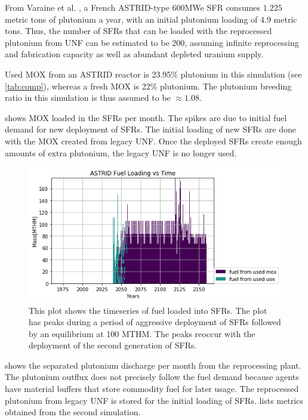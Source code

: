 From Varaine et al. \cite{varaine_pre-conceptual_2012}, a French
ASTRID-type 600\gls{MWe} \gls{SFR} consumes $1.225$ metric tons of
plutonium a year, with an initial plutonium loading of $4.9$ metric tons. 
Thus, the number of \glspl{SFR} that can be loaded with the reprocessed
plutonium from \gls{UNF} can be estimated to be 200, assuming infinite 
reprocessing and fabrication capacity as well as abundant depleted uranium 
supply.
 
Used \gls{MOX} from an ASTRID reactor is 23.95\% plutonium
in this simulation (see \cref{tab:comp}), whereas a fresh \gls{MOX} is 22\% plutonium.
The plutonium breeding ratio in this simulation is thus assumed to be
$\approx 1.08$.

 shows \gls{MOX} loaded in the \glspl{SFR} per month.
The spikes are due to initial fuel demand for new deployment of \glspl{SFR}.
The initial loading of new \glspl{SFR} are done with the \gls{MOX} created
from legacy \gls{UNF}. Once the deployed \glspl{SFR} create enough amounts
 of extra plutonium, the legacy \gls{UNF} is no longer used. 

\begin{figure}[htbp!]
	\begin{center}
		\includegraphics[scale=0.7]{./images/french-transition/where_fuel.png}
	\end{center}
	\caption{This plot shows the timeseries of fuel loaded into \glspl{SFR}.
			 The plot has peaks during a period of aggressive deployment of \glspl{SFR}
			 followed by an equilibrium at 100 \gls{MTHM}. The peaks reoccur with the
			 deployment of the second generation of \glspl{SFR}.}
	\label{fig:fuel}
\end{figure}


  shows the separated plutonium discharge
per month from the reprocessing plant. The plutonium outflux
does not precisely follow the fuel demand because \Cyclus agents have
material buffers that store commodity fuel for later usage. The reprocessed
plutonium from legacy \gls{UNF} is stored for the initial loading of \glspl{SFR}.
 lists metrics obtained from the second simulation.

